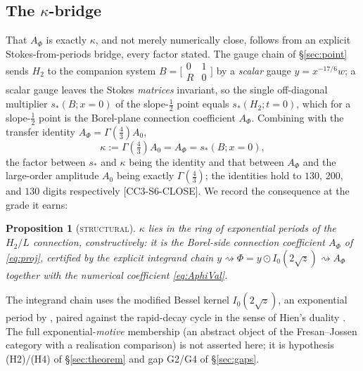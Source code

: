 \documentclass[11pt,reqno]{amsart}
\theoremstyle{plain}
\newtheorem{proposition}[theorem]{Proposition}
\theoremstyle{definition}
\theoremstyle{remark}
\newcommand{\Htwo}{H_{2}}
\newcommand{\claim}[1]{\textsf{\small[#1]}}
\begin{document}
\subsection{The $\kappa$-bridge}\label{sec:bridge}
That $A_{\Phi}$ is exactly $\kappa$, and not merely numerically close, follows
from an explicit Stokes-from-periods bridge, every factor stated. The gauge
chain of \S\ref{sec:point} sends $\Htwo$ to the companion system
$B=\bigl[\begin{smallmatrix}0&1\\ R&0\end{smallmatrix}\bigr]$ by a
\emph{scalar} gauge $y=x^{-17/6}w$; a scalar gauge leaves the Stokes
\emph{matrices} invariant, so the single off-diagonal multiplier
$s_{*}(B;x=0)$ of the slope-$\tfrac12$ point equals $s_{*}(\Htwo;t=0)$, which
for a slope-$\tfrac12$ point is the Borel-plane connection coefficient
$A_{\Phi}$. Combining with the transfer identity $A_{\Phi}=\Gamma(\tfrac43)A_{0}$,
\begin{equation}\label{eq:kbridge}
  \kappa:=\Gamma(\tfrac43)A_{0}=A_{\Phi}=s_{*}(B;x=0),
\end{equation}
the factor between $s_{*}$ and $\kappa$ being the identity and that between
$A_{\Phi}$ and the large-order amplitude $A_{0}$ being exactly
$\Gamma(\tfrac43)$; the identities hold to $130$, $200$, and $130$ digits
respectively \claim{CC3-S6-CLOSE}. We record the consequence at the grade it
earns:
\begin{proposition}[\textsc{structural}]\label{prop:expperiod}
$\kappa$ lies in the ring of exponential periods of the $\Htwo/L$ connection,
constructively: it is the Borel-side connection coefficient $A_{\Phi}$ of
\eqref{eq:proj}, certified by the explicit integrand chain
$y\rightsquigarrow\Phi=y\odot I_{0}(2\sqrt z)\rightsquigarrow A_{\Phi}$ together
with the numerical coefficient \eqref{eq:AphiVal}.
\end{proposition}
\noindent The integrand chain uses the modified Bessel kernel $I_{0}(2\sqrt z)$,
an exponential period by \cite[10.9.19]{DLMF}, paired against the rapid-decay
cycle in the sense of Hien's duality \cite{Hien}. The full
exponential-\emph{motive} membership (an abstract object of the
Fresan--Jossen category with a realisation comparison) is not asserted here; it
is hypothesis (H2)/(H4) of \S\ref{sec:theorem} and gap G2/G4 of
\S\ref{sec:gaps}.
\end{document}
